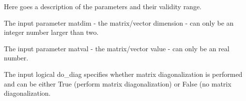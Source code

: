 Here goes a description of the parameters and their validity range.


\begin{DoxyItemize}
\item The input parameter {\ttfamily matdim} -\/ the matrix/vector dimension -\/ can only be an integer number larger than two.
\item The input parameter {\ttfamily matval} -\/ the matrix/vector value -\/ can only be an real number.
\item The input logical {\ttfamily do\+\_\+diag} specifies whether matrix diagonalization is performed and can be either {\ttfamily True} (perform matrix diagonalization) or {\ttfamily False} (no matrix diagonalization. 
\end{DoxyItemize}